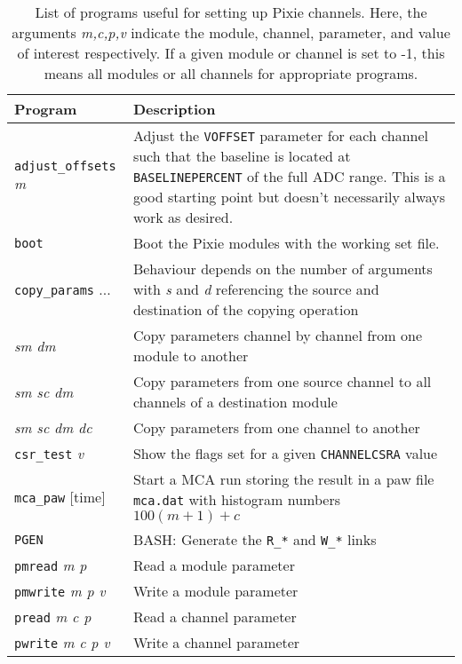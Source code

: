 \documentclass{article}
\begin{document}
\begin{table}[htp]
\label{tab:setup_programs}
\caption{List of programs useful for setting up Pixie channels. Here, the arguments {\it m,c,p,v} indicate the module, channel, parameter, and value of interest respectively. If a given module or channel is set to -1, this means all modules or all channels for appropriate programs.}
\begin{tabular}{l p{3in}}
\hline
Program & Description \\
\hline
\texttt{adjust\_offsets} {\it m} & Adjust the \texttt{VOFFSET} parameter for each channel such that the baseline is located at \texttt{BASELINEPERCENT} of the full ADC range. This is a good starting point but doesn't necessarily always work as desired.\\
\texttt{boot} & Boot the Pixie modules with the working set file. \\
\texttt{copy\_params} ... & Behaviour depends on the number of arguments with {\it s} and {\it d} referencing the source and destination of the copying operation  \\
\hspace{0.2in} {\it sm dm} & \hspace{0.2in}Copy parameters channel by channel from one module to another \\
\hspace{0.2in} {\it sm sc dm} & \hspace{0.2in}Copy parameters from one source channel to all channels of a destination module \\
\hspace{0.2in} {\it sm sc dm dc} & \hspace{0.2in} Copy parameters from one channel to another \\
\texttt{csr\_test} {\it v} & Show the flags set for a given \texttt{CHANNELCSRA} value \\
\texttt{mca\_paw} [time] & Start a MCA run storing the result in a paw file \texttt{mca.dat} with histogram numbers $100(m+1) + c$ \\
\texttt{PGEN} & \textsc{BASH:} Generate the \texttt{R\_*} and \texttt{W\_*} links \\
\texttt{pmread} {\it m p} & Read a module parameter \\
\texttt{pmwrite} {\it m p v} & Write a module parameter \\
\texttt{pread} {\it m c p} & Read a channel parameter \\
\texttt{pwrite} {\it m c p v} & Write a channel parameter \\

\end{tabular}
\end{table}
\end{document}
